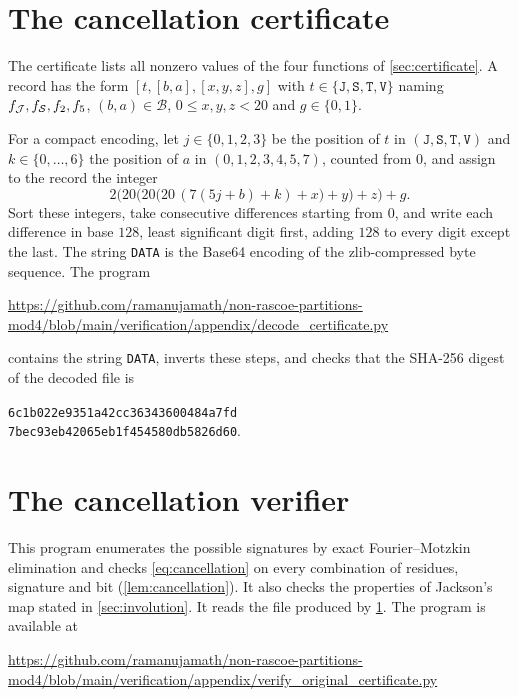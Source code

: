 \section{The cancellation certificate}\label{app:certificate}

The certificate lists all nonzero values of the four functions of
\cref{sec:certificate}. A record has the form $[t,[b,a],[x,y,z],g]$ with
$t\in\{\texttt J,\texttt S,\texttt T,\texttt V\}$ naming $f_{\mathcal J},f_{\mathcal S},f_2,f_5$,
$(b,a)\in\mathcal B$, $0\le x,y,z<20$ and $g\in\{0,1\}$.

For a compact encoding, let $j\in\{0,1,2,3\}$ be the position of $t$ in
$(\texttt J,\texttt S,\texttt T,\texttt V)$ and $k\in\{0,\dots,6\}$ the position of $a$ in
$(0,1,2,3,4,5,7)$, counted from $0$, and assign to the record the integer
\[
  2\bigl(20\bigl(20\bigl(20\,(7(5j+b)+k)+x\bigr)+y\bigr)+z\bigr)+g .
\]
Sort these integers, take consecutive differences starting from $0$, and write
each difference in base $128$, least significant digit first, adding $128$ to
every digit except the last. The string \texttt{DATA} is the Base64 encoding of
the zlib-compressed byte sequence. The program
\begin{center}
\url{https://github.com/ramanujamath/non-rascoe-partitions-mod4/blob/main/verification/appendix/decode_certificate.py}
\end{center}
contains the string \texttt{DATA}, inverts these steps, and checks that the
SHA-256 digest of the decoded file is
\begin{center}
\texttt{6c1b022e9351a42cc36343600484a7fd}\\
\texttt{7bec93eb42065eb1f454580db5826d60}.
\end{center}

\section{The cancellation verifier}\label{app:verifier}

This program enumerates the possible signatures by exact Fourier--Motzkin
elimination and checks \eqref{eq:cancellation} on every combination of residues,
signature and bit (\cref{lem:cancellation}). It also checks the properties of
Jackson's map stated in \cref{sec:involution}. It reads the file produced by
\cref{app:certificate}. The program is available at
\begin{center}
\url{https://github.com/ramanujamath/non-rascoe-partitions-mod4/blob/main/verification/appendix/verify_original_certificate.py}
\end{center}


